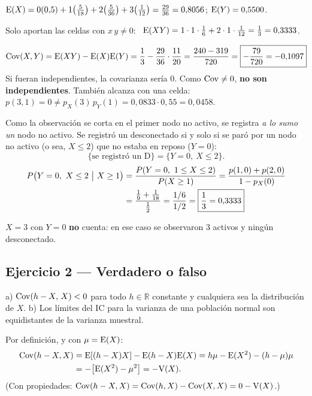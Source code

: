 $\mathrm{E}(X)=0(0{,}5)+1\big(\tfrac{5}{18}\big)+2\big(\tfrac{5}{36}\big)+3\big(\tfrac1{12}\big)=\tfrac{29}{36}=0{,}8056$; \quad
$\mathrm{E}(Y)=0{,}5500$.

 Solo aportan las celdas con $x\,y\neq0$: \ $\mathrm{E}(XY)=1\cdot1\cdot\tfrac16+2\cdot1\cdot\tfrac1{12}=\tfrac13=0{,}3333$.

\[
\mathrm{Cov}(X,Y)=\mathrm{E}(XY)-\mathrm{E}(X)\mathrm{E}(Y)=\frac13-\frac{29}{36}\cdot\frac{11}{20}=\frac{240-319}{720}=\boxed{-\frac{79}{720}=-0{,}1097}
\]
 Si fueran independientes, la covarianza sería 0. Como $\mathrm{Cov}\neq0$, \textbf{no son independientes}. También alcanza con una celda: $p(3,1)=0\neq p_X(3)\,p_Y(1)=0{,}0833\cdot0{,}55=0{,}0458$.

 Como la observación se corta en el primer nodo no activo, se registra \emph{a lo sumo un} nodo no activo. Se registró un desconectado si y solo si se paró por un nodo no activo (o sea, $X\le2$) que no estaba en reposo ($Y=0$):
\[
\{\text{se registró un D}\}=\{Y=0,\ X\le2\}.
\]
\begin{align*}
P\big(Y=0,\ X\le2\ \big|\ X\ge1\big)&=\frac{P(Y=0,\ 1\le X\le2)}{P(X\ge1)}=\frac{p(1,0)+p(2,0)}{1-p_X(0)}\\
&=\frac{\frac19+\frac1{18}}{\frac12}=\frac{1/6}{1/2}=\boxed{\frac13=0{,}3333}
\end{align*}
\begin{ojo}
$X=3$ con $Y=0$ \textbf{no} cuenta: en ese caso se observaron 3 activos y ningún desconectado.
\end{ojo}

\subsection{Ejercicio 2 --- Verdadero o falso}
\begin{enun}
a) $\mathrm{Cov}(h-X,\,X)<0$ para todo $h\in\mathbb{R}$ constante y cualquiera sea la distribución de $X$.
b) Los límites del IC para la varianza de una población normal son equidistantes de la varianza muestral.
\end{enun}
 Por definición, y con $\mu=\mathrm{E}(X)$:
\begin{align*}
\mathrm{Cov}(h-X,X)&=\mathrm{E}[(h-X)X]-\mathrm{E}(h-X)\mathrm{E}(X)=h\mu-\mathrm{E}(X^2)-(h-\mu)\mu\\
&=-\big[\mathrm{E}(X^2)-\mu^2\big]=-\mathrm{V}(X).
\end{align*}
(Con propiedades: $\mathrm{Cov}(h-X,X)=\mathrm{Cov}(h,X)-\mathrm{Cov}(X,X)=0-\mathrm{V}(X)$.)

